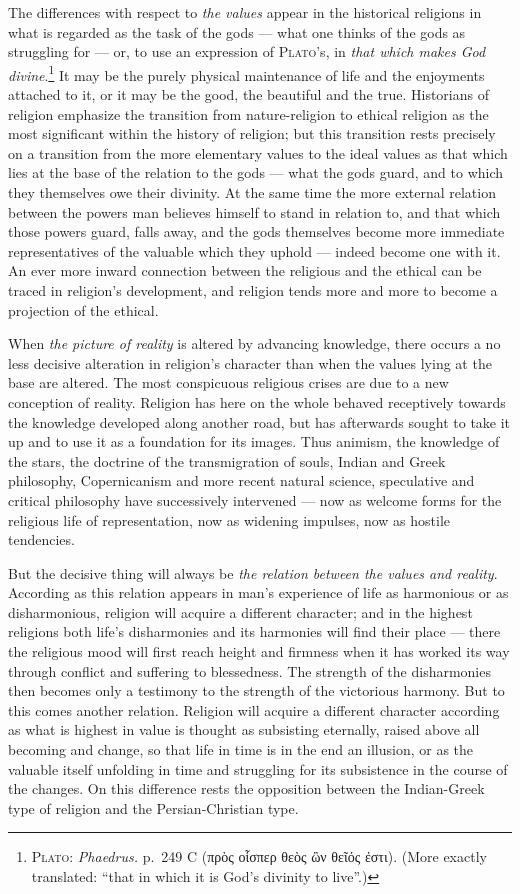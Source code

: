 \documentclass[12pt,a4paper]{book}
\newcommand{\opage}[1]{\marginnote{\footnotesize\textit{[#1]}}}
\begin{document}
The differences with respect to \emph{the values} appear in the historical
religions in what is regarded as the task of the gods --- what one thinks of the
gods as struggling for --- or, to use an expression of \textsc{Plato}'s, in
\emph{that which makes God divine}.\footnote{\textsc{Plato}: \textit{Phaedrus.}
p.~249 C (πρὸς οἷσπερ θεὸς ὢν θεῖός ἐστι). (More exactly translated: ``that in
which it is God's divinity to live''.)} It may be the purely physical maintenance
of life and the enjoyments attached to it, or it may be the good, the beautiful
and the true. Historians of religion emphasize the transition from
nature-religion to ethical religion as the most significant within the history of
religion; but this transition rests precisely on a transition from the more
elementary values to the ideal values as that which lies at the base of the
relation to the gods --- what the gods guard, and to which they themselves owe
their divinity. At the same time the more external relation between the powers
man believes himself to stand in relation to, and that which those powers guard,
falls away, and the gods themselves become more immediate representatives of the
valuable which they uphold --- indeed become one with it. An ever more inward
connection between the religious and the ethical can be traced in religion's
development, and religion tends more and more to become a projection of the
ethical.

\opage{83}When \emph{the picture of reality} is altered by advancing knowledge, there
occurs a no less decisive alteration in religion's character than when the values
lying at the base are altered. The most conspicuous religious crises are due to a
new conception of reality. Religion has here on the whole behaved receptively
towards the knowledge developed along another road, but has afterwards sought to
take it up and to use it as a foundation for its images. Thus animism, the
knowledge of the stars, the doctrine of the transmigration of souls, Indian and
Greek philosophy, Copernicanism and more recent natural science, speculative and
critical philosophy have successively intervened --- now as welcome forms for the
religious life of representation, now as widening impulses, now as hostile
tendencies.

But the decisive thing will always be \emph{the relation between the values and
reality}. According as this relation appears in man's experience of life as
harmonious or as disharmonious, religion will acquire a different character; and
in the highest religions both life's disharmonies and its harmonies will find
their place --- there the religious mood will first reach height and firmness
when it has worked its way through conflict and suffering to blessedness. The
strength of the disharmonies then becomes only a testimony to the strength of the
victorious harmony. But to this comes another relation. Religion will acquire a
different character according as what is highest in value is thought as
subsisting eternally, raised above all becoming and change, so that life in time
is in the end an illusion, or as the valuable itself unfolding in time and
struggling for its subsistence in the course of the changes. On this difference
rests the opposition between the Indian-Greek type of religion and the
Persian-Christian type.
\end{document}
